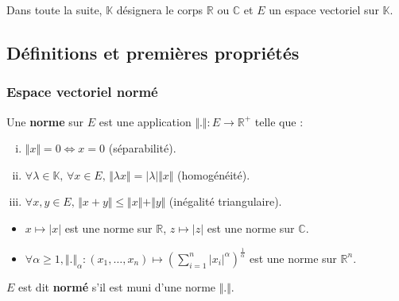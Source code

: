 




	Dans toute la suite, $\mathbb{K}$ désignera le corps $\mathbb{R}$ ou $\mathbb{C}$ et $E$ un espace vectoriel sur $\mathbb{K}$.

	\subsection{Définitions et premières propriétés}

	\subsubsection{Espace vectoriel normé}


	\begin{definition}
		Une \textbf{norme} sur $E$ est une application $\Vert . \Vert : E \rightarrow \mathbb{R}^+$ telle que :
		\begin{enumerate}[(i)]
			\item $\Vert x \Vert = 0 \iff x = 0$ (séparabilité).
			\item $\forall \lambda \in \mathbb{K}, \, \forall x \in E, \, \Vert \lambda x \Vert = \vert \lambda \vert \Vert x \Vert$ (homogénéité).
			\item $\forall x, y \in E, \, \Vert x + y \Vert \leq \Vert x \Vert + \Vert y \Vert$ (inégalité triangulaire).
		\end{enumerate}
	\end{definition}

	\begin{example}
		\label{208-1}
		\begin{itemize}
			\item $x \mapsto \vert x \vert$ est une norme sur $\mathbb{R}$, $z \mapsto \vert z \vert$ est une norme sur $\mathbb{C}$.
			\item $\forall \alpha \geq 1, \Vert . \Vert_\alpha : (x_1, \dots, x_n) \mapsto \left(\sum_{i=1}^n \vert x_i \vert^\alpha\right)^{\frac{1}{\alpha}}$ est une norme sur $\mathbb{R}^n$.
		\end{itemize}
	\end{example}


	\begin{definition}
		$E$ est dit \textbf{normé} s'il est muni d'une norme $\Vert . \Vert$.
	\end{definition}

